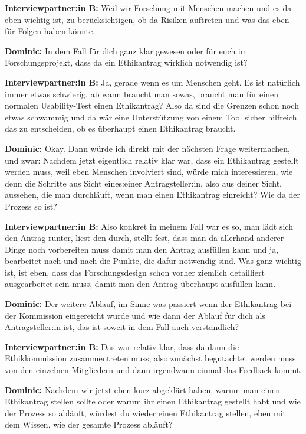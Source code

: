 \documentclass[a4paper,12pt,twoside,numbers=noendperiod]{scrreprt}
\begin{document}
\textbf{Interviewpartner:in B:} Weil wir Forschung mit Menschen machen und es da eben wichtig ist, zu berücksichtigen, ob da Risiken auftreten und was das eben für Folgen haben könnte.

\textbf{Dominic:} In dem Fall für dich ganz klar gewesen oder für euch im Forschungsprojekt, dass da ein Ethikantrag wirklich notwendig ist?

\textbf{Interviewpartner:in B:} Ja, gerade wenn es um Menschen geht. Es ist natürlich immer etwas schwierig, ab wann braucht man sowas, braucht man für einen normalen Usability-Test einen Ethikantrag? Also da sind die Grenzen schon noch etwas schwammig und da wär eine Unterstützung von einem Tool sicher hilfreich das zu entscheiden, ob es überhaupt einen Ethikantrag braucht.

\textbf{Dominic:} Okay. Dann würde ich direkt mit der nächsten Frage weitermachen, und zwar: Nachdem jetzt eigentlich relativ klar war, dass ein Ethikantrag gestellt werden muss, weil eben Menschen involviert sind, würde mich interessieren, wie denn die Schritte aus Sicht eines:einer Antragsteller:in, also aus deiner Sicht, aussehen, die man durchläuft, wenn man einen Ethikantrag einreicht? Wie da der Prozess so ist?

\textbf{Interviewpartner:in B:} Also konkret in meinem Fall war es so, man lädt sich den Antrag runter, liest den durch, stellt fest, dass man da allerhand anderer Dinge noch vorbereiten muss damit man den Antrag ausfüllen kann und ja, bearbeitet nach und nach die Punkte, die dafür notwendig sind. Was ganz wichtig ist, ist eben, dass das Forschungsdesign schon vorher ziemlich detailliert ausgearbeitet sein muss, damit man den Antrag überhaupt ausfüllen kann.

\textbf{Dominic:} Der weitere Ablauf, im Sinne was passiert wenn der Ethikantrag bei der Kommission eingereicht wurde und wie dann der Ablauf für dich als Antragsteller:in ist, das ist soweit in dem Fall auch verständlich?

\textbf{Interviewpartner:in B:} Das war relativ klar, dass da dann die Ethikkommission zusammentreten muss, also zunächst begutachtet werden muss von den einzelnen Mitgliedern und dann irgendwann einmal das Feedback kommt.

\textbf{Dominic:} Nachdem wir jetzt eben kurz abgeklärt haben, warum man einen Ethikantrag stellen sollte oder warum ihr einen Ethikantrag gestellt habt und wie der Prozess so abläuft, würdest du wieder einen Ethikantrag stellen, eben mit dem Wissen, wie der gesamte Prozess abläuft?
\end{document}
